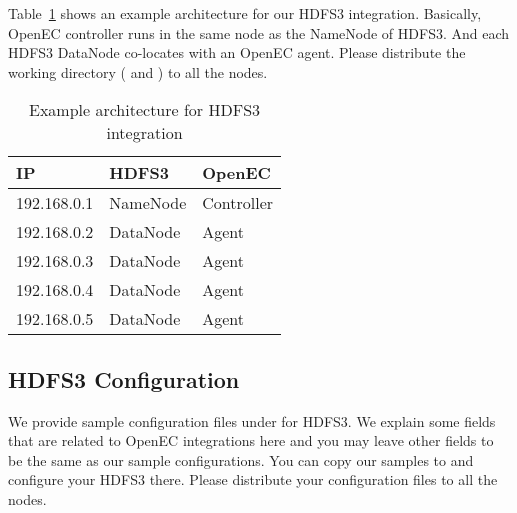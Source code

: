 \documentclass[letterpaper,12pt]{article}
\newcommand{\openec}{{\sf\small OpenEC}\xspace}
\begin{document}
Table~\ref{tab:hdfs3arch} shows an example architecture for our HDFS3 integration.
Basically, \openec controller runs in the same node as the NameNode of HDFS3.
And each HDFS3 DataNode co-locates with an \openec agent. Please distribute
the working directory ( and ) to all 
the nodes.

\begin{table}[h]
\centering
\footnotesize
\renewcommand{\arraystretch}{1.1}
\begin{tabular}{|l|l|l|}
\hline
IP & HDFS3 & OpenEC \\
\hline
\hline
192.168.0.1 & NameNode & Controller \\
\hline
192.168.0.2 & DataNode & Agent \\
\hline
192.168.0.3 & DataNode & Agent \\
\hline
192.168.0.4 & DataNode & Agent \\
\hline
192.168.0.5 & DataNode & Agent \\
\hline
\end{tabular}
\vspace{-3pt}
\caption{Example architecture for HDFS3 integration}
\label{tab:hdfs3arch}
\end{table}

\subsection{HDFS3 Configuration}

We provide sample configuration files under  for HDFS3.
We explain some fields that are related to \openec integrations here and you may leave other fields
to be the same as our sample configurations. You can copy our samples to 
and configure your HDFS3 there. Please distribute your configuration files to all the nodes.
\end{document}
